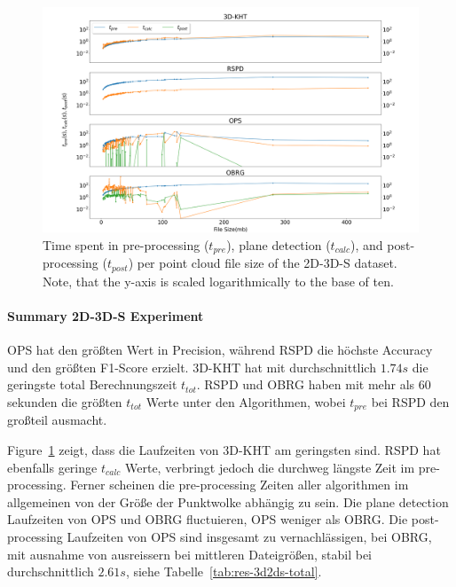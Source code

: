 \documentclass[main.tex]{subfiles}
\begin{document}
\begin{figure}[H]
    \centering
    \includegraphics[width=\textwidth]{images/SDsizetime.png}
    \caption[Time per Cloud size 2D-3D-S]{Time spent in pre-processing ($t_{pre}$), plane detection ($t_{calc}$), 
    and post-processing ($t_{post}$) per point cloud file size of the 2D-3D-S dataset. Note, that the y-axis is 
    scaled logarithmically to the base of ten.}
    \label{fig:sizetimestanford}
\end{figure}


\paragraph{Summary 2D-3D-S Experiment}
OPS hat den größten Wert in Precision, während RSPD die höchste Accuracy und den größten F1-Score erzielt.
3D-KHT hat mit durchschnittlich $1.74s$ die geringste total Berechnungszeit $t_{tot}$. RSPD und OBRG haben mit mehr als 60 sekunden
die größten $t_{tot}$ Werte unter den Algorithmen, wobei $t_{pre}$ bei RSPD den großteil ausmacht.

Figure~\ref{fig:sizetimestanford} zeigt, dass die Laufzeiten von 3D-KHT am geringsten sind. RSPD hat ebenfalls geringe $t_{calc}$ Werte,
verbringt jedoch die durchweg längste Zeit im pre-processing.
Ferner scheinen die pre-processing Zeiten aller algorithmen im allgemeinen von der Größe der Punktwolke abhängig zu sein.
Die plane detection Laufzeiten von OPS und OBRG fluctuieren, OPS weniger als OBRG. 
Die post-processing Laufzeiten von OPS sind insgesamt zu vernachlässigen, bei OBRG, mit ausnahme von ausreissern bei mittleren Dateigrößen,
 stabil bei durchschnittlich $2.61s$, siehe Tabelle~\ref{tab:res-3d2ds-total}.     
\end{document}
